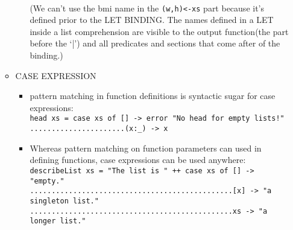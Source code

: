 \documentclass[a4paper,10pt]{article}
\begin{document}
\begin{enumerate}
\begin{itemize}
\begin{itemize}
    \\(We can't use the bmi name in the \texttt{(w,h)<-xs} part because it's defined prior to the LET BINDING. The names defined in a LET inside a list comprehension are visible to the output function(the part before the `|') and all predicates and sections that come after of the binding.)
    \end{itemize}
    \item CASE EXPRESSION
    \begin{itemize}
     \item pattern matching in function definitions is syntactic sugar for case expressions:
     \\\texttt{head\textquotesingle \ xs = case xs of [] -> error "No head for empty lists!"}
     \\\texttt{......................(x:\_) -> x}
     \item Whereas pattern matching on function parameters can used in defining functions, case expressions can be used anywhere:
     \\\texttt{describeList xs = "The list is " ++ case xs of [] -> "empty."}
     \\\texttt{...............................................[x] -> "a singleton list."}
     \\\texttt{...............................................xs -> "a longer list."}

   \end{itemize}
  \end{itemize}
\end{enumerate}
\end{document}
